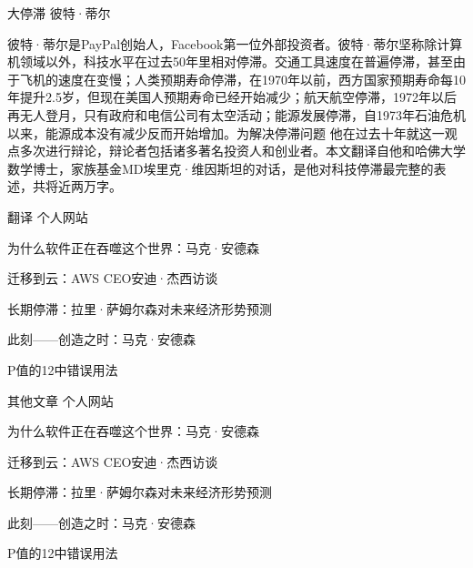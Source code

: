 

\begin{cventries}

  \cventry
    {大停滞} %
    {彼特·蒂尔} %
    {} %
    {} %
    {
      \begin{cvitems} %
        \item {彼特·蒂尔是PayPal创始人，Facebook第一位外部投资者。彼特·蒂尔坚称除计算机领域以外，科技水平在过去50年里相对停滞。交通工具速度在普遍停滞，甚至由于飞机的速度在变慢；人类预期寿命停滞，在1970年以前，西方国家预期寿命每10年提升2.5岁，但现在美国人预期寿命已经开始减少；航天航空停滞，1972年以后再无人登月，只有政府和电信公司有太空活动；能源发展停滞，自1973年石油危机以来，能源成本没有减少反而开始增加。为解决停滞问题
        他在过去十年就这一观点多次进行辩论，辩论者包括诸多著名投资人和创业者。本文翻译自他和哈佛大学数学博士，家族基金MD埃里克·维因斯坦的对话，是他对科技停滞最完整的表述，共将近两万字。}
      \end{cvitems}
    }

    \cventry
    {翻译} %
    {个人网站} %
    {} %
    {} %
    {
      \begin{cvitems} %
        \item {为什么软件正在吞噬这个世界：马克·安德森}
        \item {迁移到云：AWS CEO安迪·杰西访谈}
        \item {长期停滞：拉里·萨姆尔森对未来经济形势预测}
        \item {此刻——创造之时：马克·安德森}
        \item {P值的12中错误用法}
      \end{cvitems}
    }


    \cventry
    {其他文章} %
    {个人网站} %
    {} %
    {} %
    {
      \begin{cvitems} %
        \item {为什么软件正在吞噬这个世界：马克·安德森}
        \item {迁移到云：AWS CEO安迪·杰西访谈}
        \item {长期停滞：拉里·萨姆尔森对未来经济形势预测}
        \item {此刻——创造之时：马克·安德森}
        \item {P值的12中错误用法}
      \end{cvitems}
    }

\end{cventries}

